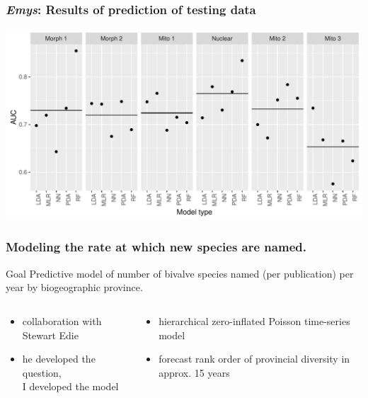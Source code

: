 \documentclass{beamer}
\begin{document}
\begin{frame}
  \frametitle{\textit{Emys}: Results of prediction of testing data}
  \begin{center}
    \includegraphics[width=\textwidth,height=0.8\textheight,keepaspectratio=true]{figure/emys_oos_sel}
  \end{center}
\end{frame}


\begin{frame}
  \frametitle{Modeling the rate at which new species are named.}

  \begin{block}{Goal}
    Predictive model of number of bivalve species named (per publication) per year by biogeographic province.
  \end{block}

  \begin{columns}
    \begin{column}{0.5\textwidth}
      \begin{itemize}
        \item collaboration with Stewart Edie
        \item he developed the question, \\I developed the model
      \end{itemize}
    \end{column}
    \begin{column}{0.5\textwidth}
      \begin{itemize}
        \item hierarchical zero-inflated Poisson time-series model
        \item forecast rank order of provincial diversity in approx. 15 years
      \end{itemize}
    \end{column}
  \end{columns}
\end{frame}
\end{document}
